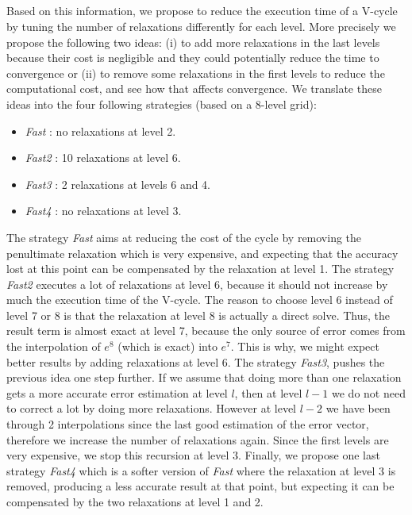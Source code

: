\subsection{}

Based on this information, we propose to reduce the execution time of a V-cycle
by tuning the number of relaxations differently for each level. More precisely
we propose the following two ideas: (i) to add more relaxations in the last
levels because their cost is negligible and they could potentially reduce the
time to convergence or (ii) to remove some relaxations in the first levels to
reduce the computational cost, and see how that affects convergence. We
translate these ideas into the four following strategies (based on a 8-level
grid):

\begin{itemize}
    \item \emph{Fast } : no relaxations at level 2.
    \item \emph{Fast2} : 10 relaxations at level 6.
    \item \emph{Fast3} :  2 relaxations at levels 6 and 4.
    \item \emph{Fast4} : no relaxations at level 3.
\end{itemize}

The strategy \emph{Fast} aims at reducing the cost of the cycle by removing the
penultimate relaxation which is very expensive, and expecting that the accuracy
lost at this point can be compensated by the relaxation at level 1.  The
strategy \emph{Fast2} executes a lot of relaxations at level 6, because it
should not increase by much the execution time of the V-cycle.  The reason to
choose level 6 instead of level 7 or 8 is that the relaxation at level 8 is
actually a direct solve. Thus, the result term is almost exact at level 7,
because the only source of error comes from the interpolation of $e^8$ (which
is exact) into $e^7$. This is why, we might expect better results by adding
relaxations at level 6. The strategy \emph{Fast3}, pushes the previous idea one
step further. If we assume that doing more than one relaxation gets a more
accurate error estimation at level $l$, then at level $l-1$ we do not need to
correct a lot by doing more relaxations. However at level $l-2$ we have been
through 2 interpolations since the last good estimation of the error vector,
therefore we increase the number of relaxations again. Since the first levels
are very expensive, we stop this recursion at level 3.  Finally, we propose one
last strategy \emph{Fast4} which is a softer version of \emph{Fast} where the
relaxation at level 3 is removed, producing a less accurate result at that
point, but expecting it can be compensated by the two relaxations at level 1
and 2.


